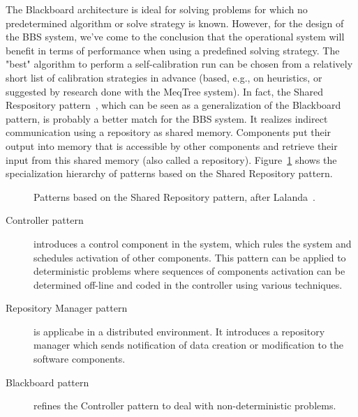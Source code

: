 \documentclass[10pt]{lofar}
\begin{document}
The Blackboard architecture is ideal for solving problems for which no
predetermined algorithm or solve strategy is known. However, for the design of
the BBS system, we've come to the conclusion that the operational system will
benefit in terms of performance when using a predefined solving strategy. The
"best" algorithm to perform a self-calibration run can be chosen from a
relatively short list of calibration strategies in advance (based, e.g., on
heuristics, or suggested by research done with the MeqTree system).  In fact,
the Shared Respository pattern~\cite{Lalanda1998}, which can be seen as a
generalization of the Blackboard pattern, is probably a better match for the
BBS system. It realizes indirect communication using a repository as shared
memory. Components put their output into memory that is accessible by other
components and retrieve their input from this shared memory (also called a
repository). Figure~\ref{fig:shared-repository-pattern} shows the
specialization hierarchy of patterns based on the Shared Repository pattern.

\begin{figure}[!ht]
\centering
{}
\caption{Patterns based on the Shared Repository pattern, after
Lalanda~\cite{Lalanda1998}.}
\label{fig:shared-repository-pattern}
\end{figure}

\begin{description}
\item [Controller pattern] introduces a control component in the system, which
rules the system and schedules activation of other components. This pattern
can be applied to deterministic problems where sequences of components
activation can be determined off-line and coded in the controller using
various techniques.
\item[Repository Manager pattern] is applicabe in a distributed
environment. It introduces a repository manager which sends notification of
data creation or modification to the software components.
\item[Blackboard pattern] refines the Controller pattern to deal with
non-deterministic problems.
\end{description}
\end{document}
